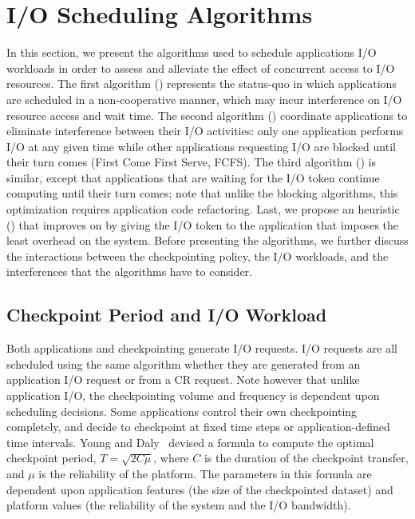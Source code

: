 
\section{I/O Scheduling Algorithms}
\label{sec:algorithms}

In this section, we present the algorithms used to schedule applications
I/O workloads in order to assess and alleviate the effect of concurrent access
to I/O resources. The first algorithm (\nocoop) represents the status-quo
in which applications are scheduled in a non-cooperative manner, which may
incur interference on I/O resource access and wait time. The second
algorithm (\fifoblock) coordinate applications to eliminate interference
between their I/O activities: only one application performs I/O at any given
time while other applications requesting I/O are blocked until their
turn comes (First Come First Serve, FCFS). The third algorithm (\fifononblock) is similar, except
that applications that are waiting for the I/O token
continue computing until their turn comes; note that unlike the
blocking algorithms, this optimization requires
application code refactoring. Last, we propose an heuristic
(\leastwaste) that improves on \fifononblock by giving the I/O token
to the application that imposes the least overhead on the system. Before
presenting the algorithms, we further discuss the interactions between
the checkpointing policy, the I/O workloads, and the interferences that the
algorithms have to consider.


\subsection{Checkpoint Period and I/O Workload}

Both applications and checkpointing generate I/O requests. I/O requests
are all scheduled using the same algorithm whether they
are generated from an application I/O request or from a CR
request. Note however that unlike application I/O, the checkpointing
volume and frequency is dependent upon scheduling decisions.
Some applications
control their own checkpointing completely, and decide to checkpoint at
fixed time steps or application-defined time intervals.
Young and Daly~\cite{young74,daly04} devised a formula to compute the optimal
checkpoint period, $T=\sqrt{2 C \mu}$, where $C$ is the duration of the
checkpoint transfer, and $\mu$ is the reliability of the platform.
The parameters in this formula are dependent upon application features
(the size of the checkpointed dataset) and platform values (the reliability
of the system and the I/O bandwidth).

